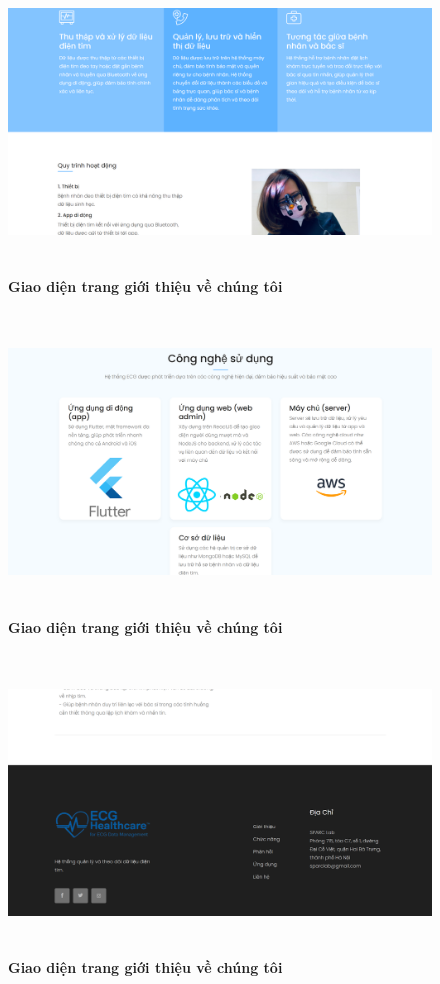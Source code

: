 \begin{figure}[H]
	\centering
	\includegraphics[width=15cm,height=8cm]{Images/about_us/about_us_3.png}
	\caption[Giao diện trang giới thiệu về chúng tôi]{\bfseries \fontsize{12pt}{0pt}\selectfont Giao diện trang giới thiệu về chúng tôi}
	\label{}
\end{figure}
\begin{figure}[H]
	\centering
	\includegraphics[width=15cm,height=8cm]{Images/about_us/about_us_4.png}
	\caption[Giao diện trang giới thiệu về chúng tôi]{\bfseries \fontsize{12pt}{0pt}\selectfont Giao diện trang giới thiệu về chúng tôi}
	\label{}
\end{figure}
\begin{figure}[H]
	\centering
	\includegraphics[width=15cm,height=8cm]{Images/about_us/about_us_5.png}
	\caption[Giao diện trang giới thiệu về chúng tôi]{\bfseries \fontsize{12pt}{0pt}\selectfont Giao diện trang giới thiệu về chúng tôi}
	\label{about-us}
\end{figure}

